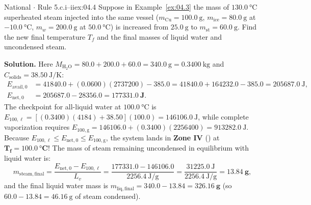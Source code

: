 \begin{workedexample}{National $\cdot$ Rule 5.c.i--ii}{ex:04.4}
Suppose in Example~\ref{ex:04.3} the mass of $\SI{130.0}{\celsius}$ superheated steam injected into the same vessel ($m_{\mathrm{Cu}} = \SI{100.0}{\gram}$, $m_{\mathrm{ice}} = \SI{80.0}{\gram}$ at $\SI{-10.0}{\celsius}$, $m_w = \SI{200.0}{\gram}$ at $\SI{50.0}{\celsius}$) is increased from $\SI{25.0}{\gram}$ to $m_{\mathrm{st}} = \SI{60.0}{\gram}$. Find the new final temperature $T_f$ and the final masses of liquid water and uncondensed steam.

\textbf{Solution.}
Here $M_{\mathrm{H_2O}} = 80.0 + 200.0 + 60.0 = \SI{340.0}{\gram} = \SI{0.3400}{\kilogram}$ and $C_{\mathrm{solids}} = \SI{38.50}{\joule\per\kelvin}$:
\begin{align*}
  E_{\mathrm{avail},0} &= 41840.0 + (0.0600)(2737200) - 385.0 = 41840.0 + 164232.0 - 385.0 = \SI{205687.0}{\joule}, \\
  E_{\mathrm{net},0} &= 205687.0 - 28356.0 = \mathbf{\SI{177331.0}{\joule}}.
\end{align*}
The checkpoint for all-liquid water at $\SI{100.0}{\celsius}$ is $E_{\mathrm{100,\ell}} = \left[(0.3400)(4184) + 38.50\right](100.0) = \SI{146106.0}{\joule}$, while complete vaporization requires $E_{\mathrm{100,g}} = 146106.0 + (0.3400)(2256400) = \SI{913282.0}{\joule}$. Because $E_{\mathrm{100,\ell}} \leq E_{\mathrm{net},0} \leq E_{\mathrm{100,g}}$, the system lands in \textbf{Zone IV} () at $\mathbf{T_f = \SI{100.0}{\celsius}}$! The mass of steam remaining uncondensed in equilibrium with liquid water is:
\[
  m_{\mathrm{steam,final}} = \frac{E_{\mathrm{net},0} - E_{\mathrm{100,\ell}}}{L_v} = \frac{177331.0 - 146106.0}{\SI{2256.4}{\joule\per\gram}} = \frac{\SI{31225.0}{\joule}}{\SI{2256.4}{\joule\per\gram}} = \mathbf{\SI{13.84}{\gram}},
\]
and the final liquid water mass is $m_{\mathrm{liq,final}} = 340.0 - 13.84 = \mathbf{\SI{326.16}{\gram}}$ (so $60.0 - 13.84 = \SI{46.16}{\gram}$ of steam condensed).
\end{workedexample}


